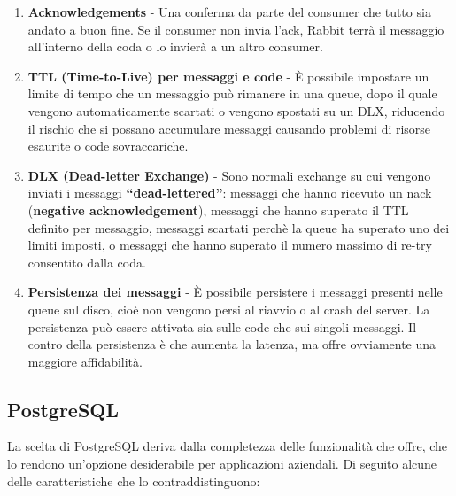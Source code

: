 \begin{itemize}
    \begin{enumerate}
      \item
        \textbf{Acknowledgements} -  Una conferma da parte del consumer che tutto sia andato a buon fine.
        Se il consumer non invia l'ack, Rabbit terr\`a il messaggio all'interno della coda o lo invier\`a a un altro consumer.
      \item \textbf{TTL (Time-to-Live) per messaggi e code} - \`E possibile impostare un limite di tempo che un messaggio pu\`o rimanere
        in una queue, dopo il quale vengono automaticamente scartati o vengono spostati su un DLX, riducendo il rischio che si
        possano accumulare messaggi causando problemi di risorse esaurite o code sovraccariche.
      \item \textbf{DLX (Dead-letter Exchange)} - Sono normali exchange su cui vengono inviati i messaggi \textbf{``dead-lettered''}: messaggi che hanno
        ricevuto un nack (\textbf{negative acknowledgement}), messaggi che hanno superato il TTL definito per messaggio, messaggi
        scartati perch\`e la queue ha superato uno dei limiti imposti, o messaggi che hanno superato il numero massimo di re-try consentito dalla coda.
      \item \textbf{Persistenza dei messaggi} -  \`E possibile persistere i messaggi presenti nelle queue sul disco,
        cio\`e non vengono persi al riavvio o al crash del server. La persistenza pu\`o essere attivata sia sulle code che sui singoli messaggi.
        Il contro della persistenza \`e che aumenta la latenza, ma offre ovviamente una maggiore affidabilit\`a.
    \end{enumerate}
\end{itemize}

\subsection{PostgreSQL}
La scelta di PostgreSQL deriva dalla completezza delle funzionalit\`a che offre, che lo rendono un'opzione desiderabile per applicazioni aziendali.
Di seguito alcune delle caratteristiche che lo contraddistinguono:

